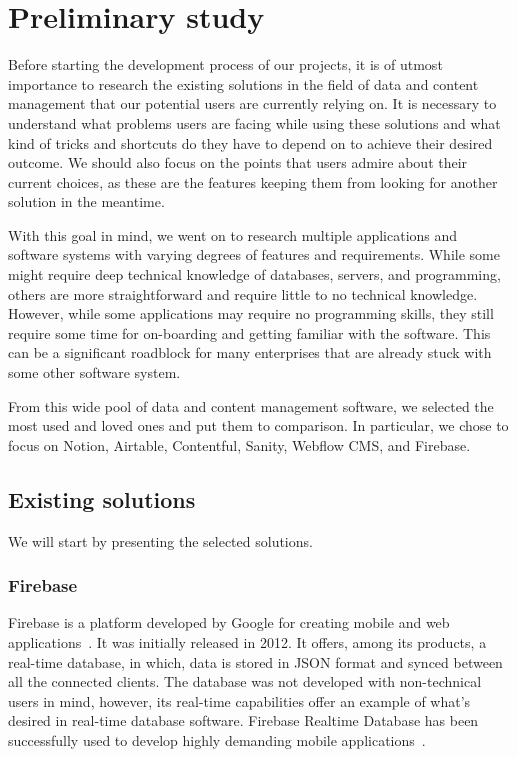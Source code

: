 \section{Preliminary study}

Before starting the development process of our projects, it is of utmost importance to research the existing solutions in the field of data and content management that our potential users are currently relying on.
It is necessary to understand what problems users are facing while using these solutions and what kind of tricks and shortcuts do they have to depend on to achieve their desired outcome.
We should also focus on the points that users admire about their current choices, as these are the features keeping them from looking for another solution in the meantime.

With this goal in mind, we went on to research multiple applications and software systems with varying degrees of features and requirements.
While some might require deep technical knowledge of databases, servers, and programming, others are more straightforward and require little to no technical knowledge.
However, while some applications may require no programming skills, they still require some time for on-boarding and getting familiar with the software.
This can be a significant roadblock for many enterprises that are already stuck with some other software system.

From this wide pool of data and content management software, we selected the most used and loved ones and put them to comparison.
In particular, we chose to focus on Notion, Airtable, Contentful, Sanity, Webflow CMS, and Firebase.

\subsection{Existing solutions}

We will start by presenting the selected solutions.

\subsubsection{Firebase}


Firebase is a platform developed by Google for creating mobile and web
applications~\autocite{noauthor_google_2018}.
It was initially released in 2012.
It offers, among its products, a real-time database, in which, data is stored in JSON format and synced between all the connected clients.
The database was not developed with non-technical users in mind, however, its real-time capabilities offer an example of what's desired in real-time database software.
Firebase Realtime Database has been successfully used to
develop highly demanding mobile applications~\autocite{noauthor_google_2018}.


